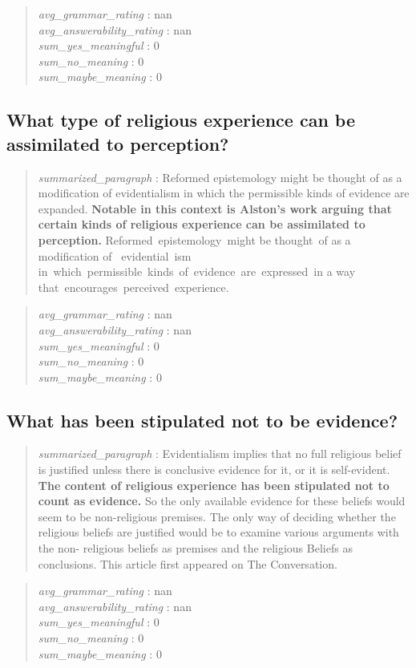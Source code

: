 \begin{quote}
\emph{avg\_grammar\_rating} : nan\\
\emph{avg\_answerability\_rating} : nan\\
\emph{sum\_yes\_meaningful} : 0\\
\emph{sum\_no\_meaning} : 0\\
\emph{sum\_maybe\_meaning} : 0
\end{quote}

\hypertarget{what-type-of-religious-experience-can-be-assimilated-to-perception}{%
\subsection{What type of religious experience can be assimilated to
perception?}\label{what-type-of-religious-experience-can-be-assimilated-to-perception}}

\begin{quote}
\emph{summarized\_paragraph} : Reformed epistemology might be thought of
as a modification of evidentialism in which the permissible kinds of
evidence are expanded. \textbf{Notable in this context is Alston's work
arguing that certain kinds of religious experience can be assimilated to
perception.} Reformed~epistemology~might be thought~of as a~
modification of~ evidential~ism
in~which~permissible~kinds~of~evidence~are~expressed~in a way
that~encourages~perceived~experience.
\end{quote}

\begin{quote}
\emph{avg\_grammar\_rating} : nan\\
\emph{avg\_answerability\_rating} : nan\\
\emph{sum\_yes\_meaningful} : 0\\
\emph{sum\_no\_meaning} : 0\\
\emph{sum\_maybe\_meaning} : 0
\end{quote}

\hypertarget{what-has-been-stipulated-not-to-be-evidence}{%
\subsection{What has been stipulated not to be
evidence?}\label{what-has-been-stipulated-not-to-be-evidence}}

\begin{quote}
\emph{summarized\_paragraph} : Evidentialism implies that no full
religious belief is justified unless there is conclusive evidence for
it, or it is self-evident. \textbf{The content of religious experience
has been stipulated not to count as evidence.} So the only available
evidence for these beliefs would seem to be non-religious premises. The
only way of deciding whether the religious beliefs are justified would
be to examine various arguments with the non- religious beliefs as
premises and the religious Beliefs as conclusions. This article first
appeared on The Conversation.
\end{quote}

\begin{quote}
\emph{avg\_grammar\_rating} : nan\\
\emph{avg\_answerability\_rating} : nan\\
\emph{sum\_yes\_meaningful} : 0\\
\emph{sum\_no\_meaning} : 0\\
\emph{sum\_maybe\_meaning} : 0
\end{quote}
